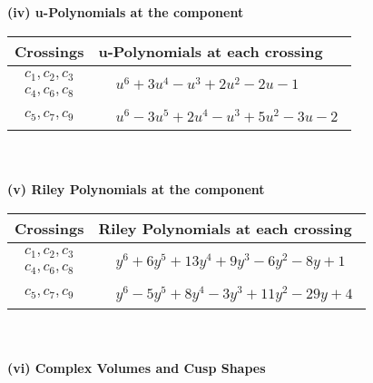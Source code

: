 \documentclass[1p]{elsarticle_modified}
\theoremstyle{definition}
\begin{document}
\newpage\renewcommand{\arraystretch}{1}
\flushleft \textbf{(iv) u-Polynomials at the component}\newline \\
\begin{tabular}{m{50pt}|m{274pt}}
Crossings & \hspace{64pt}u-Polynomials at each crossing \\
\hline $$\begin{aligned}c_{1},c_{2},c_{3}\\c_{4},c_{6},c_{8}\end{aligned}$$&$\begin{aligned}
&u^6+3 u^4- u^3+2 u^2-2 u-1
\end{aligned}$\\
\hline $$\begin{aligned}c_{5},c_{7},c_{9}\end{aligned}$$&$\begin{aligned}
&u^6-3 u^5+2 u^4- u^3+5 u^2-3 u-2
\end{aligned}$\\
\hline
\end{tabular}\\~\\
\newpage\renewcommand{\arraystretch}{1}
\flushleft \textbf{(v) Riley Polynomials at the component}\newline \\
\begin{tabular}{m{50pt}|m{274pt}}
Crossings & \hspace{64pt}Riley Polynomials at each crossing \\
\hline $$\begin{aligned}c_{1},c_{2},c_{3}\\c_{4},c_{6},c_{8}\end{aligned}$$&$\begin{aligned}
&y^6+6 y^5+13 y^4+9 y^3-6 y^2-8 y+1
\end{aligned}$\\
\hline $$\begin{aligned}c_{5},c_{7},c_{9}\end{aligned}$$&$\begin{aligned}
&y^6-5 y^5+8 y^4-3 y^3+11 y^2-29 y+4
\end{aligned}$\\
\hline
\end{tabular}\\~\\
\newpage\flushleft \textbf{(vi) Complex Volumes and Cusp Shapes}
\end{document}
